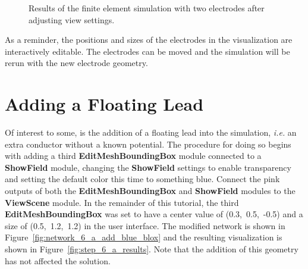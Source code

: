 \documentclass[fleqn,11pt,openany]{book}
\begin{document}
\begin{figure}
\caption{Results of the finite element simulation with two electrodes
after adjusting view settings.}\label{fig:step_5_results}
\end{figure}

As a reminder, the positions and sizes of the electrodes in the
visualization are interactively editable. The electrodes can be moved
and the simulation will be rerun with the new electrode geometry.

\section{Adding a Floating Lead}

Of interest to some, is the addition of a floating lead into the
simulation, {\em i.e.} an extra conductor without a known potential.
The procedure for doing so begins with adding a third {\bf
EditMeshBoundingBox} module connected to a {\bf ShowField} module,
changing the {\bf ShowField} settings to enable transparency and
setting the default color this time to something blue. Connect the
pink outputs of both the {\bf EditMeshBoundingBox} and {\bf
ShowField} modules to the {\bf ViewScene} module. In the remainder of
this tutorial, the third {\bf EditMeshBoundingBox} was set to have a
center value of (0.3,~0.5,~-0.5) and a size of (0.5,~1.2,~1.2) in the
user interface. The modified network is shown in
Figure~\ref{fig:network_6_a_add_blue_blox} and the resulting
visualization is shown in Figure~\ref{fig:step_6_a_results}. Note that
the addition of this geometry has not affected the solution.
\end{document}
